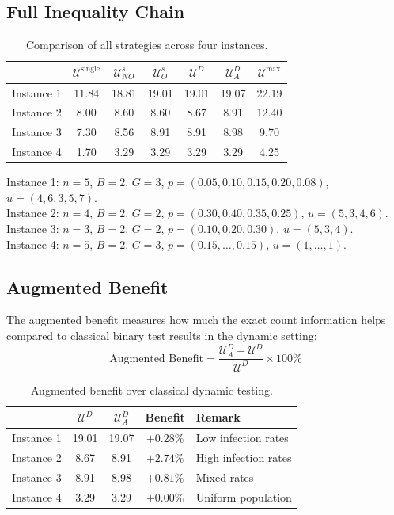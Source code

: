 \documentclass[11pt]{article}
\newcommand{\Usingle}{\mathcal{U}^{\text{single}}}
\newcommand{\UsNO}{\mathcal{U}^{s}_{NO}}
\newcommand{\UsO}{\mathcal{U}^{s}_{O}}
\newcommand{\UD}{\mathcal{U}^{D}}
\newcommand{\UDA}{\mathcal{U}^{D}_{A}}
\newcommand{\Umax}{\mathcal{U}^{\max}}
\begin{document}
\subsection{Full Inequality Chain}

\begin{table}[h]
\centering
\caption{Comparison of all strategies across four instances.}
\label{tab:inequality}
\begin{tabular}{@{}lcccccc@{}}
\toprule
 & $\Usingle$ & $\UsNO$ & $\UsO$ & $\UD$ & $\UDA$ & $\Umax$ \\
\midrule
Instance 1 & 11.84 & 18.81 & 19.01 & 19.01 & 19.07 & 22.19 \\
Instance 2 & 8.00  & 8.60  & 8.60  & 8.67  & 8.91  & 12.40 \\
Instance 3 & 7.30  & 8.56  & 8.91  & 8.91  & 8.98  & 9.70 \\
Instance 4 & 1.70  & 3.29  & 3.29  & 3.29  & 3.29  & 4.25 \\
\bottomrule
\end{tabular}
\vspace{0.5em}

\footnotesize
Instance 1: $n{=}5$, $B{=}2$, $G{=}3$, $p{=}(0.05, 0.10, 0.15, 0.20, 0.08)$, $u{=}(4, 6, 3, 5, 7)$. \\
Instance 2: $n{=}4$, $B{=}2$, $G{=}2$, $p{=}(0.30, 0.40, 0.35, 0.25)$, $u{=}(5, 3, 4, 6)$. \\
Instance 3: $n{=}3$, $B{=}2$, $G{=}2$, $p{=}(0.10, 0.20, 0.30)$, $u{=}(5, 3, 4)$. \\
Instance 4: $n{=}5$, $B{=}2$, $G{=}3$, $p{=}(0.15, \ldots, 0.15)$, $u{=}(1, \ldots, 1)$.
\end{table}

\subsection{Augmented Benefit}

The augmented benefit measures how much the exact count information helps
compared to classical binary test results in the dynamic setting:
\[
    \text{Augmented Benefit} = \frac{\UDA - \UD}{\UD} \times 100\%
\]

\begin{table}[h]
\centering
\caption{Augmented benefit over classical dynamic testing.}
\label{tab:augmented-benefit}
\begin{tabular}{@{}lcccl@{}}
\toprule
 & $\UD$ & $\UDA$ & Benefit & Remark \\
\midrule
Instance 1 & 19.01 & 19.07 & $+0.28\%$ & Low infection rates \\
Instance 2 & 8.67  & 8.91  & $+2.74\%$ & High infection rates \\
Instance 3 & 8.91  & 8.98  & $+0.81\%$ & Mixed rates \\
Instance 4 & 3.29  & 3.29  & $+0.00\%$ & Uniform population \\
\bottomrule
\end{tabular}
\end{table}
\end{document}
